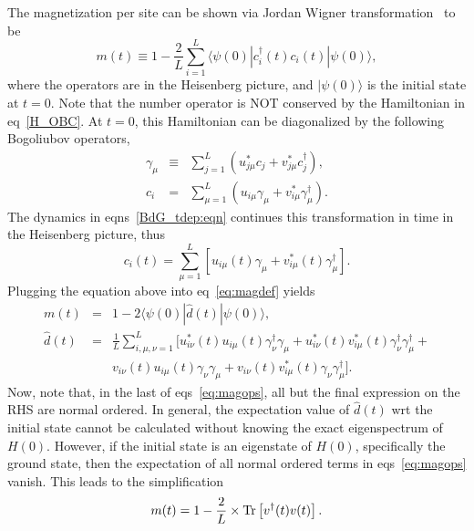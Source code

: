 \documentclass[a4paper,10pt]{report}
\begin{document}
The magnetization per site can be shown via Jordan Wigner transformation~\cite{arnab1} to be
\begin{equation}
\label{eq:magdef}
m(t)\equiv 1 - \frac{2}{L}\sum^L_{i=1} \langle \psi(0) | c^\dagger_i (t) c_i(t) |\psi(0)\rangle,
\end{equation}
where the operators are in the Heisenberg picture, and $|\psi(0)\rangle$ is the initial state at $t=0$. Note that the number operator is NOT conserved by the Hamiltonian in eq~\ref{H_OBC}. At $t=0$, this Hamiltonian can be diagonalized by the following Bogoliubov operators,
\begin{eqnarray}
\label{eq:initdiag}
\gamma_\mu &\equiv& \sum^L_{j=1} \left(u^\ast_{j\mu}c_j+v^\ast_{j\mu}c^\dagger_j\right), \nonumber \\
c_i &=& \sum^L_{\mu=1} \left(u_{i\mu}\gamma_\mu+v^\ast_{i\mu}\gamma^\dagger_\mu\right).
\end{eqnarray}
The dynamics in eqns~\ref{BdG_tdep:eqn} continues this transformation in time in the Heisenberg picture, thus
\begin{equation}
\label{eq:cit}
c_i(t) = \sum^L_{\mu=1} \left[u_{i\mu}(t)\gamma_\mu+v^\ast_{i\mu}(t)\gamma^\dagger_\mu\right].
\end{equation}
Plugging the equation above into eq~\ref{eq:magdef} yields
\begin{eqnarray}
\label{eq:magops}
 m(t) &=& 1-2 \langle\psi(0)|\hat{d}(t)|\psi(0)\rangle,\nonumber \\
 \hat{d}(t) &=& \frac{1}{L}\sum^L_{i,\mu,\nu = 1}\bigg[u^\ast_{i\nu}(t) u_{i\mu}(t)\gamma^\dagger_\nu\gamma_\mu + u^\ast_{i\nu}(t)v^\ast_{i\mu}(t)\gamma^\dagger_\nu\gamma^\dagger_\mu + \nonumber \\
  & & v_{i\nu}(t)u_{i\mu}(t)\gamma_\nu\gamma_\mu + v_{i\nu}(t)v^\ast_{i\mu}(t)\gamma_\nu\gamma^\dagger_\mu\bigg] .
\end{eqnarray}
Now, note that, in the last of eqs~\ref{eq:magops}, all but the final expression on the RHS are normal ordered. In general, the expectation value of $\hat{d}(t)$ wrt the initial state cannot be calculated without knowing the exact eigenspectrum of $H(0)$. However, if the initial state is an eigenstate of $H(0)$, specifically the ground state, then the expectation of all normal ordered terms in eqs~\ref{eq:magops} vanish. This leads to the simplification
\begin{equation}
 \label{eq:mag}
m(t) = 1 - \frac{2}{L} \times {\rm Tr}\left[{v}^\dagger(t) {v}(t)\right]. 
\end{equation}
\end{document}
